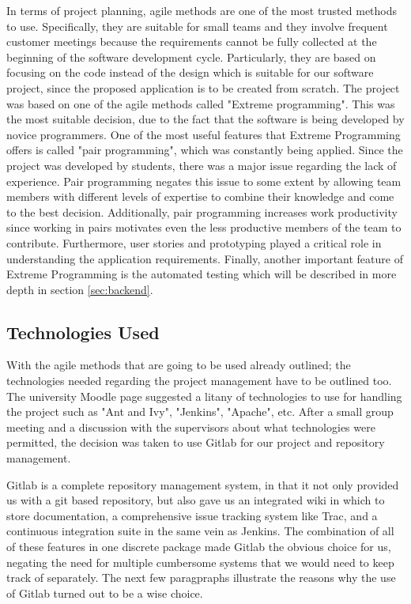\documentclass{l3proj}
\begin{document}
In terms of project planning, agile methods are one of the most trusted methods to use. Specifically, they are suitable for small teams and they involve frequent customer meetings because the requirements cannot be fully collected at the beginning of the software development cycle. Particularly, they are based on focusing on the code instead of the design which is suitable for our software project, since the proposed application is to be created from scratch. The project was based on one of the agile methods called "Extreme programming". This was the most suitable decision, due to the fact that the software is being developed by novice programmers. One of the most useful features that Extreme Programming offers is called "pair programming", which was constantly being applied. Since the project was developed by students, there was a major issue regarding the lack of experience. Pair programming negates this issue to some extent by allowing team members with different levels of expertise to combine their knowledge and come to the best decision. Additionally, pair programming increases work productivity since working in pairs motivates even the less productive members of the team to contribute. Furthermore, user stories and prototyping played a critical role in understanding the application requirements. Finally, another important feature of Extreme Programming is the automated testing which will be described in more depth in section \ref{sec:backend}.

\subsection{Technologies Used}
\label{tech}

With the agile methods that are going to be used already outlined; the technologies needed regarding the project management have to be outlined too. The university Moodle page suggested a litany of technologies to use for handling the project such as "Ant and Ivy", "Jenkins", "Apache", etc. After a small group meeting and a discussion with the supervisors about what technologies were permitted, the decision was taken to use Gitlab \cite{Gitlab} for our project and repository management.

Gitlab is a complete repository management system, in that it not only provided us with a git based repository, but also gave us an integrated wiki in which to store documentation, a comprehensive issue tracking system like Trac, and a continuous integration suite in the same vein as Jenkins. The combination of all of these features in one discrete package made Gitlab the obvious choice for us, negating the need for multiple cumbersome systems that we would need to keep track of separately. The next few paragpraphs illustrate the reasons why the use of Gitlab turned out to be a wise choice.
\end{document}
